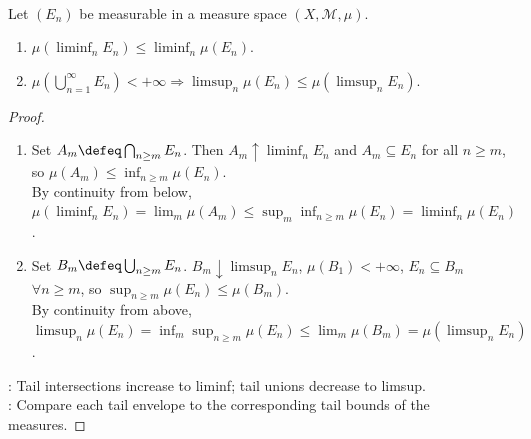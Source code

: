 \begin{proposition} \label{prop:measure-liminf-limsup-inequalities} \\
Let $(E_n)$ be measurable in a measure space $(X,\mathcal{M},\mu)$.
\begin{enumerate}[label=(\roman*)]
\setlength{\itemsep}{0pt}
\item $\mu(\liminf_nE_n)\leq\liminf_n\mu(E_n)$.
\item $\mu(\bigcup_{n=1}^{\infty}E_n)<+\infty\Longrightarrow\limsup_n\mu(E_n)\leq\mu(\limsup_nE_n)$.
\end{enumerate}
\begin{proof}
\begin{enumerate}[label=(\roman*)]
\setlength{\itemsep}{0pt}
\item Set $A_m\defeq\bigcap_{n\geq m}E_n$. Then $A_m\uparrow\liminf_nE_n$ and $A_m\subseteq E_n$ for all $n\geq m$, so $\mu(A_m)\leq\inf_{n\geq m}\mu(E_n)$.\\
By continuity from below, $\mu(\liminf_nE_n)=\lim_m\mu(A_m)\leq\sup_m\inf_{n\geq m}\mu(E_n)=\liminf_n\mu(E_n)$.
\item Set $B_m\defeq\bigcup_{n\geq m}E_n$. $B_m\downarrow\limsup_nE_n$, $\mu(B_1)<+\infty$, $E_n\subseteq B_m$ $\forall n\geq m$, so $\sup_{n\geq m}\mu(E_n)\leq\mu(B_m)$.\\
By continuity from above, $\limsup_n\mu(E_n)=\inf_m\sup_{n\geq m}\mu(E_n)\leq\lim_m\mu(B_m)=\mu(\limsup_nE_n)$.
\end{enumerate}
: Tail intersections increase to liminf; tail unions decrease to limsup.\\
: Compare each tail envelope to the corresponding tail bounds of the measures.
\end{proof}
\end{proposition}
